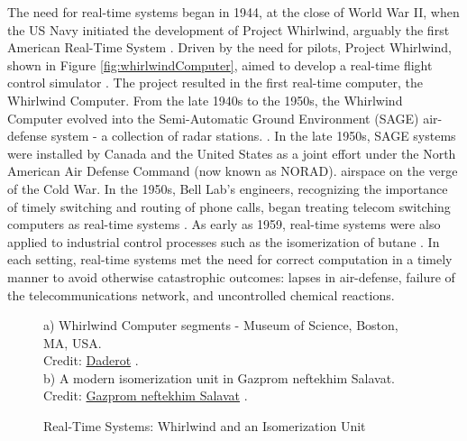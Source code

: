 The need for real-time systems began in 1944, at the close of World War II, when the US Navy initiated the development of Project Whirlwind, arguably the first American Real-Time System \cite{laplante_historical_1995}.
Driven by the need for pilots, Project Whirlwind, shown in Figure \ref{fig:whirlwindComputer}, aimed to develop a real-time flight control simulator \cite{forrester_whirlwind_1990}.
The project resulted in the first real-time computer, the Whirlwind Computer.
From the late 1940s to the 1950s, the Whirlwind Computer evolved into the Semi-Automatic Ground Environment (SAGE) air-defense system - a collection of radar stations. \cite{noauthor_tales_nodate}.
In the late 1950s, SAGE systems were installed by Canada and the United States as a joint effort under the North American Air Defense Command (now known as NORAD). airspace on the verge of the Cold War\cite{north_american_aerospace_defense_command_brief_nodate}.
In the 1950s, Bell Lab's engineers, recognizing the importance of timely switching and routing of phone calls, began treating telecom switching computers as real-time systems \cite{joel_communication_1957}.
As early as 1959, real-time systems were also applied to industrial control processes such as the isomerization of butane \cite{harrison_evolution_1981-1,stout_computer_1959}.
In each setting, real-time systems met the need for correct computation in a timely manner to avoid otherwise catastrophic outcomes: lapses in air-defense, failure of the telecommunications network, and uncontrolled chemical reactions.

\begin{figure}
    \centering
    \caption{Real-Time Systems: Whirlwind and an Isomerization Unit}
    a) Whirlwind Computer segments - Museum of Science, Boston, MA, USA.\\
    Credit: \href{https://commons.wikimedia.org/wiki/User:Daderot}{Daderot} \cite{daderot_whirlwind_2010}.\\
    b) A modern isomerization unit in Gazprom neftekhim Salavat.\\
    Credit: \href{https://salavat-neftekhim.gazprom.com/press/news/2017/06/36/}{Gazprom neftekhim Salavat} \cite{gazprom_neftekhim_salavat_state---art_2017}.
\end{figure}


